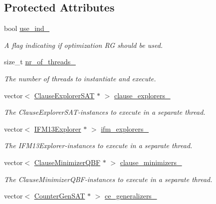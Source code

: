 \subsection*{Protected Attributes}
\begin{DoxyCompactItemize}
\item 
bool \hyperlink{classParallelLearner_aebaf891aada574da650732795f041dbe}{use\-\_\-ind\-\_\-}
\begin{DoxyCompactList}\small\item\em A flag indicating if optimization R\-G should be used. \end{DoxyCompactList}\item 
size\-\_\-t \hyperlink{classParallelLearner_a170a0abad017845877039684507e7a66}{nr\-\_\-of\-\_\-threads\-\_\-}
\begin{DoxyCompactList}\small\item\em The number of threads to instantiate and execute. \end{DoxyCompactList}\item 
vector$<$ \hyperlink{classClauseExplorerSAT}{Clause\-Explorer\-S\-A\-T} $\ast$ $>$ \hyperlink{classParallelLearner_a0e8b5dd12c8ae14089d3ce3117da3c16}{clause\-\_\-explorers\-\_\-}
\begin{DoxyCompactList}\small\item\em The Clause\-Explorer\-S\-A\-T-\/instances to execute in a separate thread. \end{DoxyCompactList}\item 
vector$<$ \hyperlink{classIFM13Explorer}{I\-F\-M13\-Explorer} $\ast$ $>$ \hyperlink{classParallelLearner_a614707a21f36d75a9fd06be57ee421d0}{ifm\-\_\-explorers\-\_\-}
\begin{DoxyCompactList}\small\item\em The I\-F\-M13\-Explorer-\/instances to execute in a separate thread. \end{DoxyCompactList}\item 
vector$<$ \hyperlink{classClauseMinimizerQBF}{Clause\-Minimizer\-Q\-B\-F} $\ast$ $>$ \hyperlink{classParallelLearner_adb5aa1e016e04c607073eaf90d994dc7}{clause\-\_\-minimizers\-\_\-}
\begin{DoxyCompactList}\small\item\em The Clause\-Minimizer\-Q\-B\-F-\/instances to execute in a separate thread. \end{DoxyCompactList}\item 
vector$<$ \hyperlink{classCounterGenSAT}{Counter\-Gen\-S\-A\-T} $\ast$ $>$ \hyperlink{classParallelLearner_a46cc16764d7ea8ffafe8d1b696c35df3}{ce\-\_\-generalizers\-\_\-}

\end{DoxyCompactItemize}

